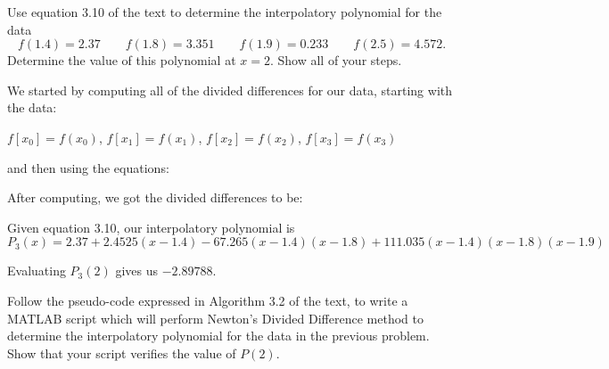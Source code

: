 \documentclass[12 pt, letterpaper]{exam}
\theoremstyle{definition}
\begin{document}
\begin{questions}
\question[50] Use equation 3.10 of the text to determine the interpolatory polynomial for the data $$f(1.4) = 2.37\quad \quad f(1.8) = 3.351 \quad \quad f(1.9) = 0.233 \quad \quad f(2.5) = 4.572.$$  Determine the value of this polynomial at $x=2.$  Show all of your steps. 
\begin{solution}
    We started by computing all of the divided differences for our data, starting with the data:

    $f[x_0]=f(x_0)$, $f[x_1]=f(x_1)$, $f[x_2]=f(x_2)$, $f[x_3]=f(x_3)$
    
    and then using the equations:


    After computing, we got the divided differences to be:


    Given equation 3.10, our interpolatory polynomial is
    $$P_3(x) = 2.37 + 2.4525(x-1.4) - 67.265(x-1.4)(x-1.8) + 111.035(x-1.4)(x-1.8)(x-1.9)$$

    Evaluating $P_3(2)$ gives us $-2.89788$.
\end{solution}

\newpage
\question[50] Follow the pseudo-code expressed in Algorithm 3.2 of the text, to write a MATLAB script which will perform Newton's Divided Difference method to determine the interpolatory polynomial for the data in the previous problem.  Show that your script verifies the value of $P(2)$.


\end{questions}
\end{document}
